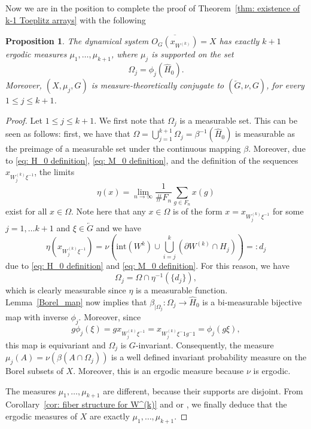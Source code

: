 \documentclass[titlepage,reqno,10pt]{amsart}
\newtheorem{proposition}[theorem]{Proposition}
\theoremstyle{definition}
\begin{document}
Now we are in the position to complete the proof of Theorem~\ref{thm: existence of k-1 Toeplitz arrays} with the following
 \begin{proposition}\label{prop: measure theoretic chara of W^(k)}
    The dynamical system $\overline{O_G(x_{W^{(k)}})}=X$ has exactly $k+1$ ergodic measures $\mu_1,\ldots, \mu_{k+1}$, where $\mu_j$ is supported on the set
   $$
   \Omega_j = \phi_j\left(\widehat{H}_0\right) . 
   $$
   Moreover, $(X, \mu_j,G)$ is measure-theoretically conjugate to $(\overleftarrow{G}, \nu,G)$, for every $1\leq j\leq k+1$. 
 \end{proposition}
    \begin{proof}
     Let $1\leq j\leq k+1$. We first note that $\Omega_j$ is a measurable set. This can be seen as follows: 
     first, we have that $\Omega=\bigcup_{j=1}^{k+1} \Omega_j=\beta^{-1}\left(\widehat{H}_0\right)$ is measurable as the preimage of a measurable set under the continuous mapping $\beta$. Moreover, due to \eqref{eq: H_0 definition}, \eqref{eq: M_0 definition}, and the definition of the sequences $x_{W^{(k)}_j\xi^{-1}}$, the limits 
     $$
     \eta(x) = \lim_{n\to\infty} \frac{1}{\#F_n} \sum_{g\in F_n} x(g) 
     $$
     exist for all $x\in\Omega$. Note here that any $x\in\Omega$ is of the form $x=x_{W^{(k)}_j\xi^{-1}}$ for some $j=1,\ldots k+1$ and $\xi\in\overleftarrow{G}$ and we have 
     $$
     \eta\left(x_{W^{(k)}_j\xi^{-1}}\right) = \nu\left(\mathrm{int}(W^{k})\cup\bigcup_{i=j}^k (\partial W^{(k)}\cap H_j)\right) =: d_j
     $$
     due to \eqref{eq: H_0 definition} and \eqref{eq: M_0 definition}. For this reason, we have 
     $$
     \Omega_j= \Omega \cap \eta^{-1}(\{d_j\}) ,
     $$ 
     which is clearly measurable since $\eta$ is a measurable function.
     Lemma~\ref{Borel_map} now implies that $\beta_{|\Omega_j}: \Omega_j \to \widehat{H}_0$ is a bi-measurable bijective map with inverse $\phi_j$. Moreover, since 
     $$
     g\phi_j(\xi)=gx_{W^{(k)}_j\xi^{-1}}=x_{W^{(k)}_j\xi^-1g^-1}=\phi_j(g\xi),
     $$
     this map is equivariant and $\Omega_j$ is $G$-invariant. Consequently, the measure $\mu_j(A)=\nu(\beta(A\cap \Omega_j))$ is a well defined invariant probability measure on the Borel subsets of $X$. Moreover, this is an ergodic measure because $\nu$ is ergodic.    

     The measures $\mu_1,\ldots, \mu_{k+1}$ are different, because their supports are disjoint. 
     From Corollary~\ref{cor: fiber structure for W^(k)} and \cite[Lemma 3.6]{HLSY21} or \cite[Prop. 3.1 and Add. 3.2]{BreHaJa25},  we finally deduce that the ergodic measures of $X$ are exactly $\mu_1,\ldots, \mu_{k+1}$. 
    \end{proof} 
\end{document}
